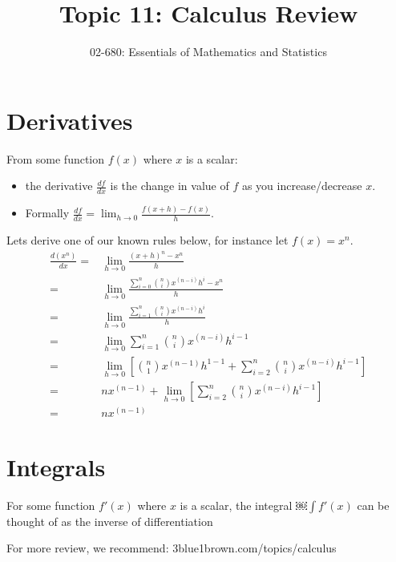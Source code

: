 


\title{Topic 11: Calculus Review}
\author{02-680: Essentials of Mathematics and Statistics}


\maketitle

\section{Derivatives}
 From some function $f(x)$ where $x$ is a scalar:
 \begin{itemize}
 \item the derivative $\displaystyle\frac{df}{dx}$ is the change in value of $f$ as you increase/decrease $x$.
 \item Formally $\displaystyle\frac{df}{dx}=\lim_{h\rightarrow 0}\frac{f\left(x+h\right) - f(x)}{h}$.
 \end{itemize}
 
 Lets derive one of our known rules below, for instance let $f(x)=x^n$. 
 \begin{align}
 \frac{d(x^n)}{dx}=&\lim_{h\rightarrow 0}\frac{(x+h)^n - x^n}{h}\\
 =& \lim_{h\rightarrow 0}\frac{\sum_{i=0}^n {n \choose i} x^{(n-i)}h^i - x^n}{h}\\
 =& \lim_{h\rightarrow 0}\frac{\sum_{i=1}^{n} {n \choose i} x^{(n-i)}h^i}{h}\\
 =& \lim_{h\rightarrow 0}\sum_{i=1}^{n} {n \choose i} x^{(n-i)}h^{i-1}\\
 =& \lim_{h\rightarrow 0} \left[{n \choose 1}x^{(n-1)}h^{1-1} + \sum_{i=2}^{n} {n \choose i} x^{(n-i)}h^{i-1}\right]\\
 =& nx^{(n-1)} + \lim_{h\rightarrow 0} \left[\sum_{i=2}^{n} {n \choose i} x^{(n-i)}h^{i-1}\right]\\
 =& nx^{(n-1)}
 \end{align}
 

\section{Integrals}
For some function $f'(x)$ where $x$ is a scalar, 
the integral $\displaystyle￼\int f'(x)$ can be thought of as the inverse of differentiation

For more review, we recommend: 3blue1brown.com/topics/calculus


